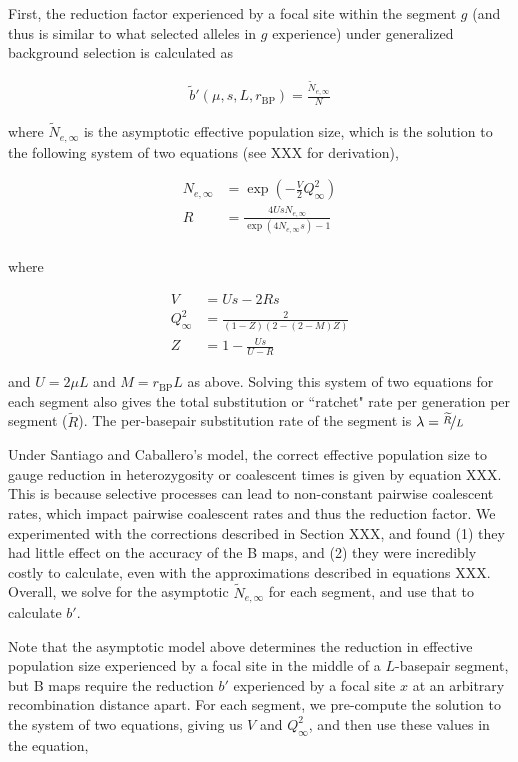 \documentclass[11pt]{article}
\begin{document}
First, the reduction factor experienced by a focal site within the segment $g$
(and thus is similar to what selected alleles in $g$ experience) under
generalized background selection is calculated as

\begin{align}
  \widetilde{b}'(\mu, s, L, r_\text{BP}) = \frac{\widetilde{N}_{e,\infty}}{N}
\end{align}

where $\widetilde{N}_{e,\infty}$ is the asymptotic effective population size,
which is the solution to the following system of two equations (see XXX for
derivation),

\begin{align}
  {N}_{e,\infty} &= \exp \left( -\frac{V}{2} Q_\infty^2 \right) \\
  {R} &= \frac{4 U s N_{e,\infty}}{\exp(4 N_{e,\infty} s)-1}\\
\end{align}

where 

\begin{align}
  V &= U s - 2 {R} s \\
  Q_\infty^2 &= \frac{2}{(1-Z)(2-(2-M)Z)} \\
  Z &= 1 - \frac{Us}{U-{R}}
\end{align}

and $U = 2\mu L$ and $M = r_\text{BP} L$ as above. Solving this system of two
equations for each segment also gives the total substitution or ``ratchet" rate
per generation per segment ($\widetilde{R}$). The per-basepair substitution
rate of the segment is $\lambda = \nicefrac{\widetilde{R}}{L}$

Under Santiago and Caballero's model, the correct effective population size to
gauge reduction in heterozygosity or coalescent times is given by equation XXX.
This is because selective processes can lead to non-constant pairwise
coalescent rates, which impact pairwise coalescent rates and thus the reduction
factor. We experimented with the corrections described in Section XXX, and
found (1) they had little effect on the accuracy of the B maps, and (2) they
were incredibly costly to calculate, even with the approximations described in
equations XXX. Overall, we solve for the asymptotic $\widetilde{N}_{e,\infty}$
for each segment, and use that to calculate $b'$.

Note that the asymptotic model above determines the reduction in effective
population size experienced by a focal site in the middle of a $L$-basepair
segment, but B maps require the reduction $b'$ experienced by a focal site $x$
at an arbitrary recombination distance apart. For each segment, we pre-compute
the solution to the system of two equations, giving us $V$ and $Q_\infty^2$,
and then use these values in the equation,
\end{document}

